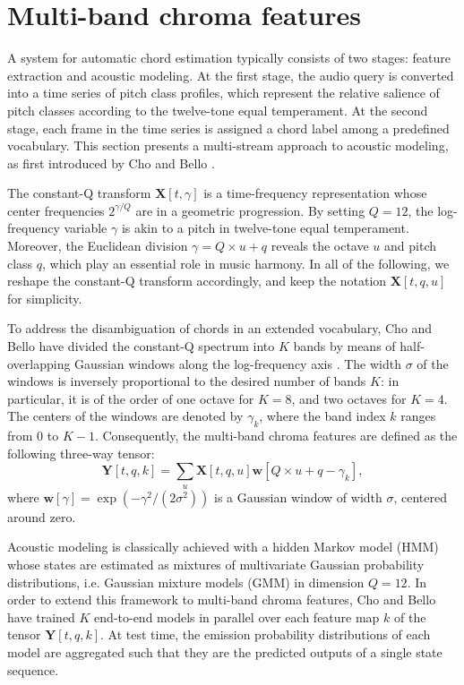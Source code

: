 \documentclass{article}
\makeatletter
\newcommand*{\ie}{i.e.\@\xspace}
\makeatother
\begin{document}
\section{Multi-band chroma features}
A system for automatic chord estimation typically consists of two stages:
feature extraction and acoustic modeling.
At the first stage, the audio query is converted into a time series of
pitch class profiles, which represent the relative salience of
pitch classes according to the twelve-tone equal temperament.
At the second stage, each frame in the time series is assigned
a chord label among a predefined vocabulary.
This section presents a multi-stream approach to acoustic modeling,
as first introduced by Cho and Bello \cite{cho2013mirex}.

The constant-Q transform $\mathbf{X}[t, \gamma]$ is a time-frequency
representation whose center frequencies $2^{\gamma/Q}$ are in a geometric progression.
By setting $Q=12$, the log-frequency variable $\gamma$ is akin to a pitch in twelve-tone
equal temperament.
Moreover, the Euclidean division $\gamma = Q \times u + q$
reveals the octave $u$ and pitch class $q$,
which play an essential role in music harmony.
In all of the following, we reshape the constant-Q transform
accordingly, and keep the notation $\mathbf{X}[t, q, u]$ for simplicity.

To address the disambiguation of chords in an extended vocabulary,
Cho and Bello have divided the constant-Q spectrum into $K$
bands by means of half-overlapping Gaussian windows along
the log-frequency axis \cite{cho2013mirex}.
The width $\sigma$ of the windows is inversely proportional
to the desired number of bands $K$:
in particular, it is of the order of one octave for $K=8$,
and two octaves for $K=4$.
The centers of the windows are denoted by $\gamma_k$, where
the band index $k$ ranges from $0$ to $K-1$.
Consequently, the multi-band chroma features are defined as the following
three-way tensor:
\begin{equation}
\mathbf{Y}[t, q, k]
=
\sum_{u} 
\mathbf{X}[t, q, u]
\boldsymbol{w}[Q \times u + q - \gamma_k],
\end{equation}
where
$\boldsymbol{w}[\gamma] = \exp( - \gamma^2 / (2\sigma^2))$
is a Gaussian window of width $\sigma$, centered around zero.

Acoustic modeling is classically achieved with a hidden Markov model (HMM)
whose states are estimated as mixtures of multivariate Gaussian probability
distributions, \ie Gaussian mixture models (GMM) in dimension $Q=12$.
In order to extend this framework to multi-band chroma features, Cho and Bello
have trained $K$ end-to-end models in parallel over each feature map $k$
of the tensor $\mathbf{Y}[t, q, k]$.
At test time, the emission probability distributions of each model
are aggregated such that they are the predicted outputs of a single state sequence.
\end{document}
